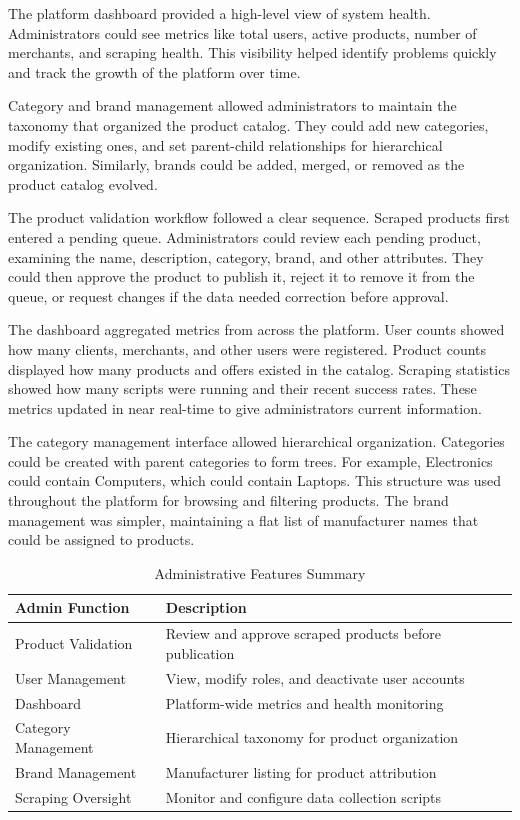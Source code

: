 The platform dashboard provided a high-level view of system
health. Administrators could see metrics like total users,
active products, number of merchants, and scraping health.
This visibility helped identify problems quickly and track
the growth of the platform over time.

Category and brand management allowed administrators to maintain
the taxonomy that organized the product catalog. They could add
new categories, modify existing ones, and set parent-child
relationships for hierarchical organization. Similarly, brands
could be added, merged, or removed as the product catalog evolved.

The product validation workflow followed a clear sequence.
Scraped products first entered a pending queue. Administrators
could review each pending product, examining the name, description,
category, brand, and other attributes. They could then approve
the product to publish it, reject it to remove it from the queue,
or request changes if the data needed correction before approval.

The dashboard aggregated metrics from across the platform.
User counts showed how many clients, merchants, and other users
were registered. Product counts displayed how many products and
offers existed in the catalog. Scraping statistics showed how
many scripts were running and their recent success rates. These
metrics updated in near real-time to give administrators current
information.

The category management interface allowed hierarchical organization.
Categories could be created with parent categories to form trees.
For example, Electronics could contain Computers, which could
contain Laptops. This structure was used throughout the platform
for browsing and filtering products. The brand management was
simpler, maintaining a flat list of manufacturer names that could
be assigned to products.

\begin{table}[H]
\begin{center}
\begin{tabular}{|m{3.5cm}|m{5.5cm}|}
\hline
\textbf{Admin Function} & \textbf{Description} \\ \hline
Product Validation & Review and approve scraped products before publication \\ \hline
User Management & View, modify roles, and deactivate user accounts \\ \hline
Dashboard & Platform-wide metrics and health monitoring \\ \hline
Category Management & Hierarchical taxonomy for product organization \\ \hline
Brand Management & Manufacturer listing for product attribution \\ \hline
Scraping Oversight & Monitor and configure data collection scripts \\ \hline
\end{tabular}
\caption{Administrative Features Summary}
\label{tab:admin_features}
\end{center}
\end{table}

